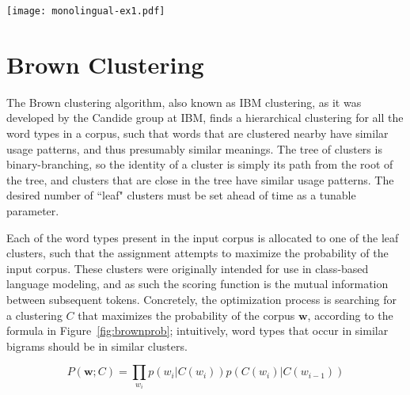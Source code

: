 \begin{figure*}
  \texttt{[image: monolingual-ex1.pdf]}
  \caption{An example dependency graph for an English sentence.}
  \label{fig:syntacticfeatures:example}
\end{figure*}

\section{Brown Clustering}
The Brown clustering algorithm\cite{brown1992class}, also known as IBM
clustering, as it was developed by the Candide group at IBM, finds a
hierarchical clustering for all the word types in a corpus, such that words
that are clustered nearby have similar usage patterns, and thus presumably
similar meanings.
The tree of clusters is binary-branching, so the identity of a cluster is
simply its path from the root of the tree, and clusters that are close in the
tree have similar usage patterns. The desired number of ``leaf" clusters must
be set ahead of time as a tunable parameter.

Each of the word types present in the input corpus is allocated to one of the
leaf clusters, such that the assignment attempts to maximize the probability of
the input corpus.  These clusters were originally intended for use in
class-based language modeling, and as such the scoring function is the mutual
information between subsequent tokens. Concretely, the optimization process is
searching for a clustering $C$ that maximizes the probability of the corpus
$\boldsymbol{w}$, according to the formula in Figure~\ref{fig:brownprob};
intuitively, word types that occur in similar bigrams should be in similar
clusters.

\begin{figure*}

  \begin{equation} \label{eq:brownclassprob}
  P(\boldsymbol{w}; C) = \prod_{w_i} p(w_i | C(w_i)) p(C(w_i) | C(w_{i-1}))
  \end{equation}

  \caption{The Brown clustering expression for the probability of a corpus with
  a specific clustering $C$. It is the product, for each token, of the
  probability of that token given its cluster, and the probability of that
  current cluster given the previous cluster. This is analogous to the
  ``emission" and ``transition" probabilities used in an HMM-based tagger.}
  \label{fig:brownprob}
\end{figure*}

